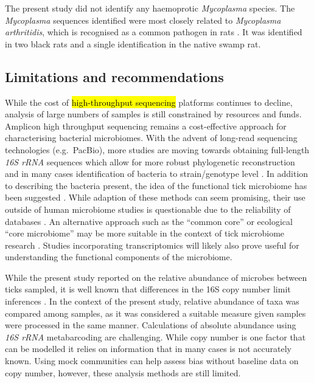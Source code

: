 \documentclass[a4paper, nobind]{templates/ociamthesis}
\begin{document}
The present study did not identify any haemoprotic \emph{Mycoplasma} species. The \emph{Mycoplasma} sequences identified were most closely related to \emph{Mycoplasma arthritidis}, which is recognised as a common pathogen in rats \autocite{dybvigGenomeMycoplasmaArthritidis2008}.
It was identified in two black rats and a single identification in the native swamp rat.

\hypertarget{limitations-and-recommendations}{%
\subsection{Limitations and recommendations}\label{limitations-and-recommendations}}

While the cost of \hl{high-throughput sequencing} platforms continues to decline, analysis of large numbers of samples is still constrained by resources and funds.
Amplicon high throughput sequencing remains a cost-effective approach for characterising bacterial microbiomes.
With the advent of long-read sequencing technologies (e.g.~PacBio), more studies are moving towards obtaining full-length \emph{16S rRNA} sequences which allow for more robust phylogenetic reconstruction and in many cases identification of bacteria to strain/genotype level \autocite{earlSpecieslevelBacterialCommunity2018,callahanHighthroughputAmpliconSequencing2019}.
In addition to describing the bacteria present, the idea of the functional tick microbiome has been suggested \autocite{estrada-penaTaxonomicVariabilityFunctional2020}.
While adaption of these methods can seem promising, their use outside of human microbiome studies is questionable due to the reliability of databases \autocite{bonnetUpdateIntricateTango2020,sunInferencebasedAccuracyMetagenome2020}.
An alternative approach such as the ``common core'' or ecological ``core microbiome'' may be more suitable in the context of tick microbiome research \autocite{riselyApplyingCoreMicrobiome2020}.
Studies incorporating transcriptomics will likely also prove useful for understanding the functional components of the microbiome.

While the present study reported on the relative abundance of microbes between ticks sampled, it is well known that differences in the 16S copy number limit inferences \autocite{brooksTruthMetagenomicsQuantifying2015,loucaCorrecting16SRRNA2018}.
In the context of the present study, relative abundance of taxa was compared among samples, as it was considered a suitable measure given samples were processed in the same manner.
Calculations of absolute abundance using \emph{16S rRNA} metabarcoding are challenging. While copy number is one factor that can be modelled it relies on information that in many cases is not accurately known.
Using mock communities can help assess bias without baseline data on copy number, however, these analysis methods are still limited.
\end{document}
